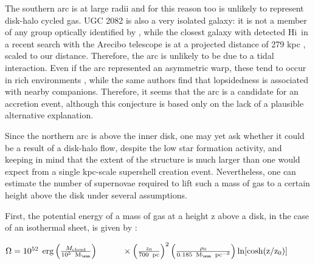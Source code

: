 \documentclass[useAMS,usenatbib]{mn2e}
\newcommand\HI{H{\sc i}}
\begin{document}
{The southern arc is at large radii and for this reason too is unlikely
to represent disk-halo cycled gas.  UGC 2082 is also a very isolated
galaxy: it is not a member of any group optically identified by
\citet{2000ApJ...543..178G}, while the closest galaxy with detected
\HI\ in a recent search with the Arecibo telescope is at a projected
distance of 279 kpc \citep{2011AAS...21724606T}, scaled to our
distance.  Therefore, the arc is unlikely to be due to a tidal
interaction.  Even if the arc represented an asymmetric warp, these
tend to occur in rich environments \citep*{2002A&A...394..769G}, while
the same authors find that lopsidedness is associated with nearby
companions.  Therefore, it seems that the arc is a candidate for an
accretion event, although this conjecture is based only on the lack of
a plausible alternative explanation.

Since the northern arc is above the inner disk, one may yet ask
whether it could be a result of a disk-halo flow, despite the low star
formation activity, and keeping in mind that the extent of the
structure is much larger than one would expect from a single kpc-scale
supershell creation event.  Nevertheless, one can estimate the number
of supernovae required to lift such a mass of gas to a certain height
above the disk under several assumptions.

First, the potential energy of a mass of gas at a height z above a
disk, in the case of an isothermal sheet, is given by \citet{1997AJ....114.2463H}:

$
\Omega = 10^{52} \hspace{0.15 cm} {\rm erg} \left({M_{\rm cloud}\over 10^5 {\rm \hspace{0.15 cm}  M_{\sun}}}\right)\\
\hspace*{1.0 cm}\times\left({z_0\over 700 {\rm \hspace{0.15 cm} pc}}\right)^2\left({\rho_0\over 0.185 \hspace{0.15 cm} {\rm  M}_{\sun}\hspace{0.15 cm}  {\rm  pc}^{-3}}\right){\rm ln[cosh(z/z_0)]}
$

}
\end{document}
